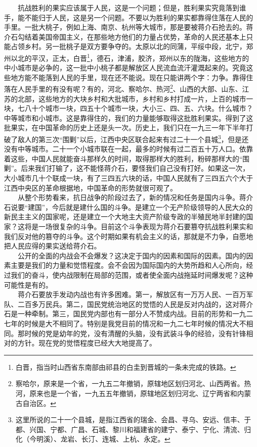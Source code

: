 \documentclass[cn,11pt,chinese]{elegantbook}
\begin{document}
　　抗战胜利的果实应该属于人民，这是一个问题；但是，胜利果实究竟落到谁手，能不能归于人民，这是另一个问题。不要以为胜利的果实都靠得住落在人民的手里。一批大桃子，例如上海、南京、杭州等大城市，那是要被蒋介石抢去的。蒋介石勾结着美国帝国主义，在那些地方他们的力量占优势，革命的人民还基本上只能占领乡村。另一批桃子是双方要争夺的。太原以北的同蒲，平绥中段，北宁，郑州以北的平汉，正太，白晋\footnote[10]{ 白晋，指当时山西省东南部由祁县的白圭到晋城的一条未完成的铁路。}，德石，津浦，胶济，郑州以东的陇海，这些地方的中小城市是必争的，这一批中小桃子都是解放区人民流血流汗灌溉起来的。究竟这些地方能不能落到人民的手里，现在还不能说。现在只能讲两个字：力争。靠得住落在人民手里的有没有呢？有的，河北、察哈尔、热河\footnote[11]{ 察哈尔，原来是一个省，一九五二年撤销，原辖地区划归河北、山西两省。热河，原来也是一个省，一九五五年撤销，原辖地区划归河北、辽宁两省和内蒙古自治区。}、山西的大部、山东、江苏的北部，这些地方的大块乡村和大批城市，乡村和乡村打成一片，上百的城市一块，七八十个城市一块，四五十个城市一块，大小三、四、五、六块。什么城市？中等城市和小城市。这是靠得住的，我们的力量能够取得这批胜利果实。得到了这批果实，在中国革命的历史上还是头一次。历史上，我们只在一九三一年下半年打破了敌人的第三次“围剿”以后，江西中央区联合起来有过二十一个县城\footnote[12]{ 这里所说的二十一个县城，是指江西省的瑞金、会昌、寻乌、安远、信丰、于都、兴国、宁都、广昌、石城、黎川和福建省的建宁、泰宁、宁化、清流、归化（今明溪）、龙岩、长汀、连城、上杭、永定。}，但是还没有中等城市。二十一个小城市联在一起，最多的时候有过二百五十万人口。依靠着这些，中国人民就能奋斗那样久的时间，取得那样大的胜利，粉碎那样大的“围剿”。后来我们打输了，这不能怪蒋介石，要怪我们自己没有打好。如果这一次，大小城市几十个联成一块，有了三四五六块的话，中国人民就有了三四五六个大于江西中央区的革命根据地，中国革命的形势就很可观了。\\
　　从整个形势看来，抗日战争的阶段过去了，新的情况和任务是国内斗争。蒋介石说要“建国”，今后就是建什么国的斗争。是建立一个无产阶级领导的人民大众的新民主主义的国家呢，还是建立一个大地主大资产阶级专政的半殖民地半封建的国家？这将是一场很复杂的斗争。目前这个斗争表现为蒋介石要篡夺抗战胜利果实和我们反对他的篡夺的斗争。这个时期如果有机会主义的话，那就是不力争，自愿地把人民应得的果实送给蒋介石。\\
　　公开的全面的内战会不会爆发？这决定于国内的因素和国际的因素。国内的因素主要是我们的力量和觉悟程度。会不会因为国际国内的大势所趋和人心所向，经过我们的奋斗，使内战限制在局部的范围，或者使全面内战拖延时间爆发呢？这种可能性是有的。\\
　　蒋介石要放手发动内战也有许多困难。第一，解放区有一万万人民、一百万军队、二百多万民兵。第二，国民党统治地区的觉悟的人民是反对内战的，这对蒋介石是一种牵制。第三，国民党内部也有一部分人不赞成内战。目前的形势和一九二七年的时候是大不相同了。特别是我党目前的情况和一九二七年时候的情况大不相同。那时候的党是幼年的党，没有清醒的头脑，没有武装斗争的经验，没有针锋相对的方针。现在党的觉悟程度已经大大地提高了。\\
\end{document}
